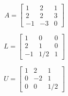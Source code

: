 \[
A=\left[
\begin{array}{ccc}
1 & 2 & 1 \\
2 & 2 & 3\\
-1 & -3 & 0
\end{array}\right]
\]
\bigskip

\[ 
L=\left[
\begin{array}{ccc}
1 & 0 & 0 \\
2 & 1 & 0\\
-1 & 1/2 & 1
\end{array}
\right]
\]

\[ 
U=\left[
\begin{array}{ccc}
 1& 2 & 1 \\
 0 & -2 & 1 \\
  0 &0 & 1/2
\end{array}
\right] 
\]

